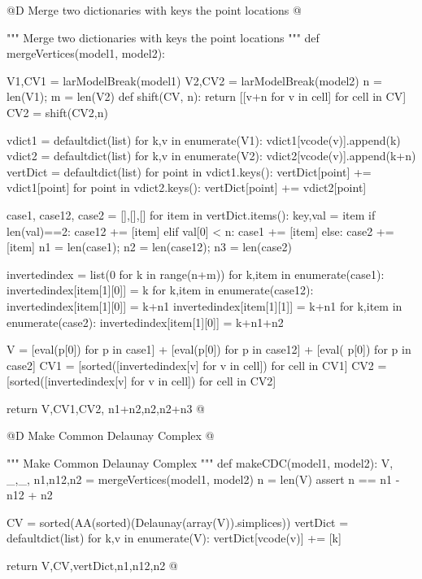 \documentclass[11pt,oneside]{article}	%
\begin{document}
@D Merge two dictionaries with keys the point locations
@{""" Merge two dictionaries with keys the point locations """
def mergeVertices(model1, model2):

	V1,CV1 = larModelBreak(model1) 
	V2,CV2 = larModelBreak(model2)
	n = len(V1); m = len(V2)
	def shift(CV, n): 
		return [[v+n for v in cell] for cell in CV]
	CV2 = shift(CV2,n)

	vdict1 = defaultdict(list)
	for k,v in enumerate(V1): vdict1[vcode(v)].append(k) 
	vdict2 = defaultdict(list)
	for k,v in enumerate(V2): vdict2[vcode(v)].append(k+n) 
	vertDict = defaultdict(list)
	for point in vdict1.keys(): vertDict[point] += vdict1[point]
	for point in vdict2.keys(): vertDict[point] += vdict2[point]

	case1, case12, case2 = [],[],[]
	for item in vertDict.items():
		key,val = item
		if len(val)==2:  case12 += [item]
		elif val[0] < n: case1 += [item]
		else: case2 += [item]
	n1 = len(case1); n2 = len(case12); n3 = len(case2)

	invertedindex = list(0 for k in range(n+m))
	for k,item in enumerate(case1):
		invertedindex[item[1][0]] = k
	for k,item in enumerate(case12):
		invertedindex[item[1][0]] = k+n1
		invertedindex[item[1][1]] = k+n1
	for k,item in enumerate(case2):
		invertedindex[item[1][0]] = k+n1+n2

	V = [eval(p[0]) for p in case1] + [eval(p[0]) for p in case12] + [eval(
				p[0]) for p in case2]
	CV1 = [sorted([invertedindex[v] for v in cell]) for cell in CV1]
	CV2 = [sorted([invertedindex[v] for v in cell]) for cell in CV2]

	return V,CV1,CV2, n1+n2,n2,n2+n3
@}




	
@D Make Common Delaunay Complex
@{""" Make Common Delaunay Complex """
def makeCDC(model1, model2):
	V, _,_, n1,n12,n2 = mergeVertices(model1, model2)
	n = len(V)
	assert n == n1 - n12 + n2
	
	CV = sorted(AA(sorted)(Delaunay(array(V)).simplices))
	vertDict = defaultdict(list)
	for k,v in enumerate(V): vertDict[vcode(v)] += [k]
	
	return V,CV,vertDict,n1,n12,n2
@}
\end{document}
